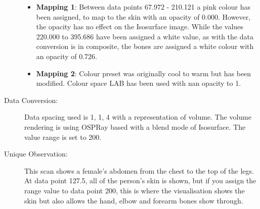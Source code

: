 \begin{description}
	\begin{itemize}
		\tightlist
		\item
		\textbf{Mapping 1}: 
		\hfill \break
			Between data points 67.972 - 210.121 a pink colour has been assigned, to map to the skin with an opacity of 0.000. However, the opacity has no effect on the Isosurface image. While the values 220.000 to 395.686 have been assigned a white value, as with the data conversion is in composite, the bones are assigned a white colour with an opacity of 0.726.
	\end{itemize}
	
	\begin{itemize}
		\tightlist
		\item
		\textbf{Mapping 2}:
		\hfill \break
			Colour preset was originally cool to warm but has been modified. Colour space LAB has been used with nan opacity to 1. 
	\end{itemize}
	
	\item[Data Conversion:] 
	\hfill \break
		Data spacing used is 1, 1, 4 with a representation of volume. The volume rendering is using OSPRay based with a blend mode of Isosurface. The value range is set to 200.
	
	\item[Unique Observation:]
	\hfill \break
		This scan shows a female's abdomen from the chest to the top of the legs. At data point 127.5, all of the person's skin is shown, but if you assign the range value to data point 200, this is where the visualisation shows the skin but also allows the hand, elbow and forearm bones show through. 
	
\end{description}
